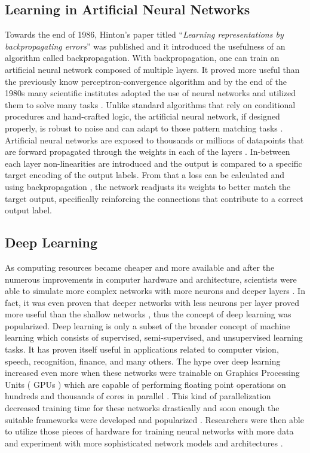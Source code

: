 \subsection{Learning in Artificial Neural Networks}
Towards the end of 1986, Hinton’s paper titled “\textit{Learning representations by backpropagating errors}”\cite{rumelhart1986learning} was published and it introduced the usefulness of an algorithm called backpropagation. With backpropagation, one can train an artificial neural network composed of multiple layers. It proved more useful than the previously know perceptron-convergence algorithm \cite{widrow199030} and by the end of the 1980s many scientific institutes adopted the use of neural networks and utilized them to solve many tasks \cite{pao1989adaptive}. Unlike standard algorithms that rely on conditional procedures and hand-crafted logic, the artificial neural network, if designed properly, is robust to noise and can adapt to those pattern matching tasks \cite{wang1994robustness}. Artificial neural networks are exposed to thousands or millions of datapoints that are forward propagated through the weights in each of the layers \cite{lecun2015deep}. In-between each layer non-linearities are introduced and the output is compared to a specific target encoding of the output labels. From that a loss can be calculated and using backpropagation \cite{rumelhart1986learning}, the network readjusts its weights to better match the target output, specifically reinforcing the connections that contribute to a correct output label.

\subsection{Deep Learning}
As computing resources became cheaper and more available and after the numerous improvements in computer hardware and architecture, scientists were able to simulate more complex networks with more neurons and deeper layers \cite{resnet}. In fact, it was even proven that deeper networks with less neurons per layer proved more useful than the shallow networks \cite{szegedy2015going}, thus the concept of deep learning was popularized. Deep learning is only a subset of the broader concept of machine learning which consists of supervised, semi-supervised, and unsupervised learning tasks. It has proven itself useful in applications related to computer vision, speech, recognition, finance, and many others. The hype over deep learning increased even more when these networks were trainable on Graphics Processing Units ( GPUs ) which are capable of performing floating point operations on hundreds and thousands of cores in parallel \cite{raina2009large}. This kind of parallelization decreased training time for these networks drastically \cite{raina2009large} and soon enough the suitable frameworks were developed and popularized \cite{tensorflow, theano}. Researchers were then able to utilize those pieces of hardware for training neural networks with more data and experiment with more sophisticated network models and architectures \cite{densenet, raina2009large,resnet}. 

